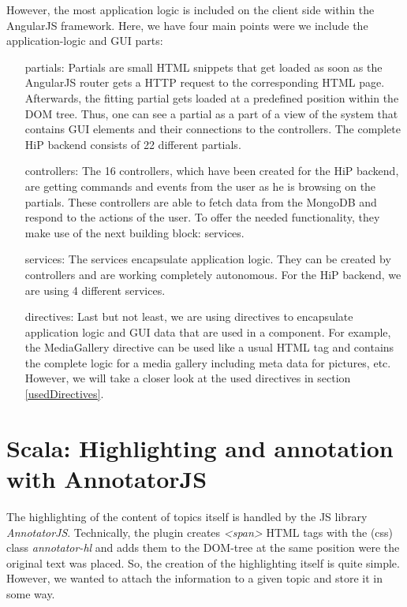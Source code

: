 However, the most application logic is included on the client side within the AngularJS framework. Here, we have four main points were we include the application-logic and \ac{GUI} parts:

\begin{itemize}
	\item[partials:] Partials are small \ac{HTML} snippets that get loaded as soon as the AngularJS router gets a \ac{HTTP} request to the corresponding \ac{HTML} page. Afterwards, the fitting partial gets loaded at a predefined position within the \ac{DOM} tree. Thus, one can see a partial as a part of a view of the system that contains \ac{GUI} elements and their connections to the controllers.  The complete \ac{HiP} backend consists of 22 different partials.  
	\item[controllers:] The 16 controllers, which have been created for the \ac{HiP} backend, are getting commands and events from the user as he is browsing on the partials. These controllers are able to fetch data from the MongoDB and respond to the actions of the user. To offer the needed functionality, they make use of the next building block: services.  
	\item[services:] The services encapsulate application logic. They can be created by controllers and are working completely autonomous. For the \ac{HiP} backend, we are using 4 different services.
	\item[directives:] Last but not least, we are using directives to encapsulate application logic and \ac{GUI} data that are used in a component. For example, the MediaGallery directive can be used like a usual \ac{HTML} tag and contains the complete logic for a media gallery including meta data for pictures, etc. However, we will take a closer look at the used directives in section \ref{usedDirectives}.
\end{itemize}

\section{Scala: Highlighting and annotation with AnnotatorJS}
The highlighting of the content of topics itself is handled by the \ac{JS} library \emph{AnnotatorJS}. Technically, the plugin creates \emph{<span>} \ac{HTML} tags with the (css) class \emph{annotator-hl} and adds them to the \ac{DOM}-tree at the same position were the original text was placed. So, the creation of the highlighting itself is quite simple. However, we wanted to attach the information to a given topic and store it in some way.  

